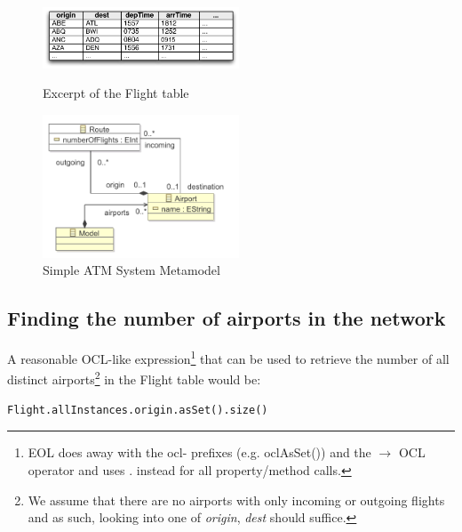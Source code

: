 \begin{figure}[ht]
\centering
\begin{minipage}[b]{0.47\linewidth}
\includegraphics[width=2.3in]{images/database.pdf}
\caption{Excerpt of the Flight table}
\label{fig:database}
\end{minipage}
\quad
\begin{minipage}[b]{0.47\linewidth}
\includegraphics[width=2.3in]{images/atms.pdf}
\caption{Simple ATM System Metamodel}
\label{fig:atms}
\end{minipage}
\end{figure}

%

\subsection{Finding the number of airports in the network}

A reasonable OCL-like expression\footnote{EOL does away with the ocl- prefixes (e.g. oclAsSet()) and the $\rightarrow$ OCL operator and uses . instead for all property/method calls.} that can be used to retrieve the number of all distinct airports\footnote{We assume that there are no airports with only incoming or outgoing flights and as such, looking into one of \emph{origin}, \emph{dest} should suffice.} in the Flight table would be:

\begin{lstlisting}
Flight.allInstances.origin.asSet().size()
\end{lstlisting}

